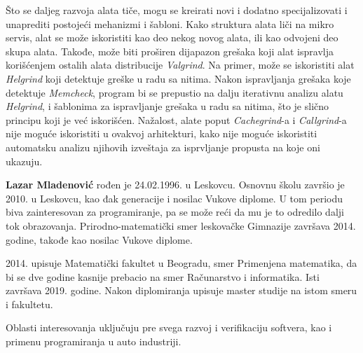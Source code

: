 \documentclass[12pt,oneside]{memoir}
\theoremstyle{plain}
\theoremstyle{definition}
\begin{document}
Što se daljeg razvoja alata tiče, mogu se kreirati novi i dodatno specijalizovati i unaprediti postojeći mehanizmi i šabloni. Kako struktura alata liči na mikro servis, alat se može iskoristiti kao deo nekog novog alata, ili kao odvojeni deo skupa alata. Takođe, može biti proširen dijapazon grešaka koji alat ispravlja korišćenjem ostalih alata distribucije \textit{Valgrind}. Na primer, može se iskoristiti alat \textit{Helgrind} koji detektuje greške u radu sa nitima. Nakon ispravljanja grešaka koje detektuje \textit{Memcheck}, program bi se prepustio na dalju iterativnu analizu alatu \textit{Helgrind}, i šablonima za ispravljanje grešaka u radu sa nitima, što je slično principu koji je već iskorišćen. Nažalost, alate poput \textit{Cachegrind}-a i \textit{Callgrind}-a nije moguće iskoristiti u ovakvoj arhitekturi, kako nije moguće iskoristiti automatsku analizu njihovih izveštaja za isprvljanje propusta na koje oni ukazuju.


\literatura

\backmatter

\begin{biografija}
  \textbf{Lazar Mladenović} rođen je 24.02.1996. u Leskovcu. Osnovnu školu završio je 2010. u Leskovcu, kao đak generacije i nosilac Vukove diplome. U tom periodu biva zainteresovan za programiranje, pa se može reći da mu je to odredilo dalji tok obrazovanja. Prirodno-matematički smer leskovačke Gimnazije završava 2014. godine, takođe kao nosilac Vukove diplome.
  
  2014. upisuje Matematički fakultet u Beogradu, smer Primenjena matematika, da bi se  dve godine kasnije prebacio na smer Računarstvo i informatika. Isti završava 2019. godine. Nakon diplomiranja upisuje master studije na istom smeru i fakultetu. 
  
  Oblasti interesovanja uključuju pre svega razvoj i verifikaciju softvera, kao i primenu programiranja u auto industriji.  
    
\end{biografija}
\end{document}
